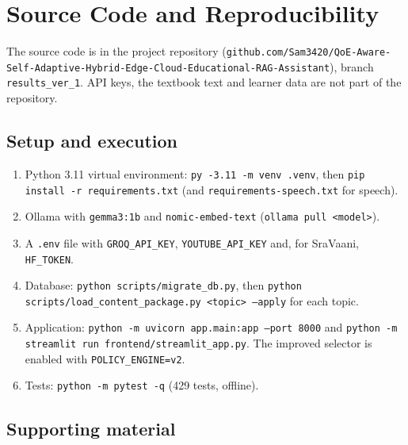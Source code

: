 \chapter{Source Code and Reproducibility}
\label{app:code}

The source code is in the project repository
(\texttt{github.com/Sam3420/QoE-Aware-Self-Adaptive-Hybrid-Edge-Cloud-Educational-RAG-Assistant}), branch
\texttt{results\_ver\_1}. API keys, the textbook text and learner data are not part of the repository.

\section{Setup and execution}

\begin{enumerate}
  \item Python 3.11 virtual environment: \texttt{py -3.11 -m venv .venv}, then
    \texttt{pip install -r requirements.txt} (and \texttt{requirements-speech.txt} for speech).
  \item Ollama with \texttt{gemma3:1b} and \texttt{nomic-embed-text} (\texttt{ollama pull <model>}).
  \item A \texttt{.env} file with \texttt{GROQ\_API\_KEY}, \texttt{YOUTUBE\_API\_KEY} and, for SraVaani,
    \texttt{HF\_TOKEN}.
  \item Database: \texttt{python scripts/migrate\_db.py}, then
    \texttt{python scripts/load\_content\_package.py <topic> --apply} for each topic.
  \item Application: \texttt{python -m uvicorn app.main:app --port 8000} and
    \texttt{python -m streamlit run frontend/streamlit\_app.py}. The improved selector is enabled with
    \texttt{POLICY\_ENGINE=v2}.
  \item Tests: \texttt{python -m pytest -q} (429 tests, offline).
\end{enumerate}

\section{Supporting material}

